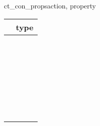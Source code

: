 \begin{methoddesc}[CS_CONNECTION]{ct_con_props}{action, property }
\begin{longtable}{l|l}
\var{property} & type \\
\hline
\code{CS_ANSI_BINDS}           & \code{bool} \\
\code{CS_ASYNC_NOTIFS}         & \code{bool} \\
\code{CS_BULK_LOGIN}           & \code{bool} \\
\code{CS_CHARSETCNV}           & \code{bool} \\
\code{CS_CONFIG_BY_SERVERNAME} & \code{bool} \\
\code{CS_DIAG_TIMEOUT}         & \code{bool} \\
\code{CS_DISABLE_POLL}         & \code{bool} \\
\code{CS_DS_COPY}              & \code{bool} \\
\code{CS_DS_EXPANDALIAS}       & \code{bool} \\
\code{CS_DS_FAILOVER}          & \code{bool} \\
\code{CS_EXPOSE_FMTS}          & \code{bool} \\
\code{CS_EXTERNAL_CONFIG}      & \code{bool} \\
\code{CS_EXTRA_INF}            & \code{bool} \\
\code{CS_HIDDEN_KEYS}          & \code{bool} \\
\code{CS_LOGIN_STATUS}         & \code{bool} \\
\code{CS_NOCHARSETCNV_REQD}    & \code{bool} \\
\code{CS_SEC_APPDEFINED}       & \code{bool} \\
\code{CS_SEC_CHALLENGE}        & \code{bool} \\
\code{CS_SEC_CHANBIND}         & \code{bool} \\
\code{CS_SEC_CONFIDENTIALITY}  & \code{bool} \\
\code{CS_SEC_DATAORIGIN}       & \code{bool} \\
\code{CS_SEC_DELEGATION}       & \code{bool} \\
\code{CS_SEC_DETECTREPLAY}     & \code{bool} \\
\code{CS_SEC_DETECTSEQ}        & \code{bool} \\
\code{CS_SEC_ENCRYPTION}       & \code{bool} \\
\code{CS_SEC_INTEGRITY}        & \code{bool} \\
\code{CS_SEC_MUTUALAUTH}       & \code{bool} \\
\code{CS_SEC_NEGOTIATE}        & \code{bool} \\
\code{CS_SEC_NETWORKAUTH}      & \code{bool} \\


\end{longtable}
\end{methoddesc}
